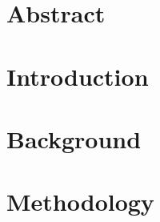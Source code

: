 \documentclass[titlepage, letterpaper, 12pt, oneside]{book}
\begin{document}

\frontmatter


\section*{Abstract}
{}


\tableofcontents
\listoffigures

\mainmatter
\doublespacing

\section{Introduction}


\section{Background}


\section{Methodology}\label{sec: methods}

\end{document}

